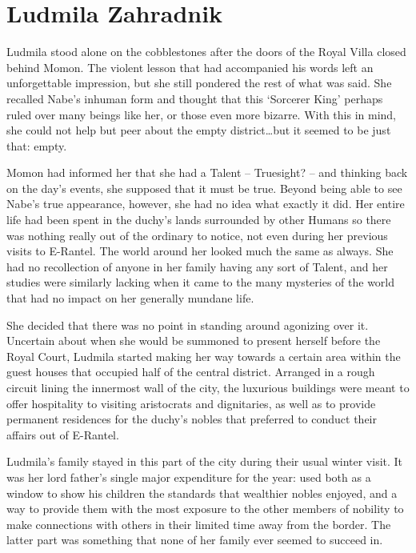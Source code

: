 \chapter{Ludmila Zahradnik}

Ludmila stood alone on the cobblestones after the doors of the Royal Villa closed behind Momon. The violent lesson that had accompanied his words left an unforgettable impression, but she still pondered the rest of what was said. She recalled Nabe’s inhuman form and thought that this ‘Sorcerer King’ perhaps ruled over many beings like her, or those even more bizarre. With this in mind, she could not help but peer about the empty district…but it seemed to be just that: empty.

 

Momon had informed her that she had a Talent – Truesight? – and thinking back on the day’s events, she supposed that it must be true. Beyond being able to see Nabe’s true appearance, however, she had no idea what exactly it did. Her entire life had been spent in the duchy’s lands surrounded by other Humans so there was nothing really out of the ordinary to notice, not even during her previous visits to E-Rantel. The world around her looked much the same as always. She had no recollection of anyone in her family having any sort of Talent, and her studies were similarly lacking when it came to the many mysteries of the world that had no impact on her generally mundane life.

 

She decided that there was no point in standing around agonizing over it. Uncertain about when she would be summoned to present herself before the Royal Court, Ludmila started making her way towards a certain area within the guest houses that occupied half of the central district. Arranged in a rough circuit lining the innermost wall of the city, the luxurious buildings were meant to offer hospitality to visiting aristocrats and dignitaries, as well as to provide permanent residences for the duchy’s nobles that preferred to conduct their affairs out of E-Rantel.

 

Ludmila’s family stayed in this part of the city during their usual winter visit. It was her lord father’s single major expenditure for the year: used both as a window to show his children the standards that wealthier nobles enjoyed, and a way to provide them with the most exposure to the other members of nobility to make connections with others in their limited time away from the border. The latter part was something that none of her family ever seemed to succeed in.

